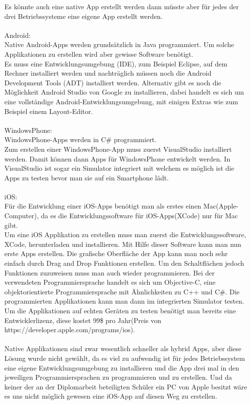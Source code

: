 Es könnte auch eine native App erstellt werden dann müsste aber für jedes der drei Betriebssysteme eine eigene App erstellt werden.\\
\\
Android:\\
Native Android-Apps werden grundsätzlich in Java programmiert. Um solche Applikationen zu erstellen wird aber gewisse Software benötigt.\\
Es muss eine Entwicklungsumgebung (IDE), zum Beispiel Eclipse, auf dem Rechner installiert werden und nachträglich müssen noch die Android Development Tools (ADT) installiert werden. Alternativ gibt es noch die Möglichkeit Android Studio von Google zu installieren, dabei handelt es sich um eine vollständige Android-Entwicklungsumgebung, mit einigen Extras wie zum Beispiel einem Layout-Editor.\\
\\
WindowsPhone:\\
WindowsPhone-Apps werden in C\# programmiert.\\
Zum erstellen einer WindowsPhone-App muss zuerst VisualStudio installiert werden. Damit können dann Apps für WindowsPhone entwickelt werden. In VisualStudio ist sogar ein Simulator integriert mit welchem es möglich ist die Apps zu testen bevor man sie auf ein Smartphone lädt.\\
\\
iOS:\\
Für die Entwicklung einer iOS-Apps benötigt man als erstes einen Mac(Apple-Computer), da es die Entwicklungssoftware für iOS-Apps(XCode) nur für Mac gibt.\\
Um eine iOS Applikation zu erstellen muss man zuerst die Entwicklungssoftware, XCode, herunterladen und installieren. Mit Hilfe dieser Software kann man nun erste Apps erstellen. Die grafische Oberfläche der App kann man noch sehr einfach durch Drag and Drop Funktionen erstellen. Um den Schaltflächen jedoch Funktionen zuzuweisen muss man auch wieder programmieren. Bei der verwendeten Programmiersprache handelt es sich um Objective-C, eine objektorientierte Programmiersprache mit Ähnlichkeiten zu C++ und C\#.
Die programmierten Applikationen kann man dann im integrierten Simulator testen.
Um die Applikationen auf echten Geräten zu testen benötigt man bereits eine Entwicklerlizenz, diese kostet 99\$ pro Jahr(Preis von https://developer.apple.com/programs/ios).\\
\\
Native Applikationen sind zwar wesentlich schneller als hybrid Apps, aber diese Lösung wurde nicht gewählt, da es viel zu aufwendig ist für jedes Betriebssystem eine eigene Entwicklungsumgebung zu installieren und die App drei mal in den jeweiligen Programmiersprachen zu programmieren und zu erstellen. Und da keiner der an der Diplomarbeit beteiligten Schüler ein PC von Apple besitzt wäre es uns nicht möglich gewesen eine iOS-App auf diesen Weg zu erstellen.\\

